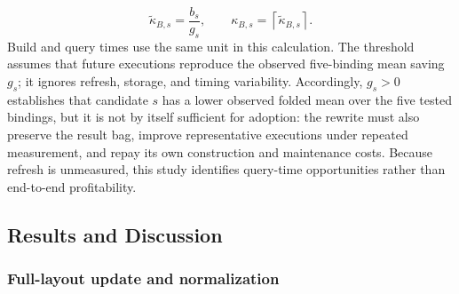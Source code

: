 \documentclass[sigconf]{acmart}
\begin{document}
\[
  \widetilde{\kappa}_{B,s}=\frac{b_s}{g_s},
  \qquad
  \kappa_{B,s}=\left\lceil\widetilde{\kappa}_{B,s}\right\rceil .
\]
Build and query times use the same unit in this calculation. The threshold
assumes that future executions reproduce the observed five-binding mean saving
$g_s$; it ignores refresh, storage, and timing variability.
Accordingly, $g_s>0$ establishes that candidate $s$ has a lower observed folded
mean over the five tested bindings, but it is not by itself sufficient for
adoption: the rewrite must also preserve the result bag, improve representative
executions under repeated measurement, and repay its own construction and
maintenance costs.
Because refresh is unmeasured, this study identifies query-time opportunities
rather than end-to-end profitability.

\subsection{Results and Discussion}
\label{subsec:fd_redundancy_results}

\subsubsection{Full-layout update and normalization}
\end{document}
